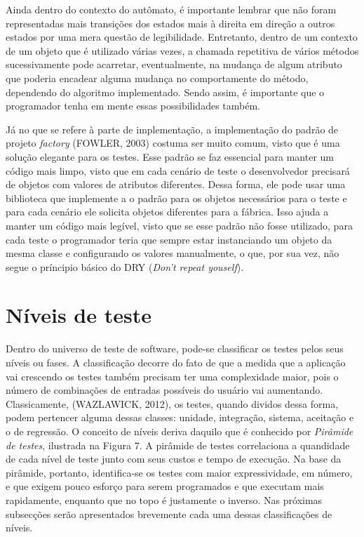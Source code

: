 \documentclass[
    12pt,       %
    openright,      %
    twoside,      %
    a4paper,      %
    english,      %
    french,       %
    spanish,      %
    brazil,       %
    ]{abntex2}
\begin{document}
          Ainda dentro do contexto do autômato, é importante lembrar que não foram representadas
          mais transições dos estados mais à direita em direção a outros estados por uma mera
          questão de legibilidade. Entretanto, dentro de um contexto de um objeto que é utilizado
          várias vezes, a chamada repetitiva de vários métodos sucessivamente pode acarretar,
          eventualmente, na mudança de algum atributo que poderia encadear alguma mudança no
          comportamente do método, dependendo do algoritmo implementado. Sendo assim, é importante
          que o programador tenha em mente essas possibilidades também.

          Já no que se refere à parte de implementação, a implementação do padrão de projeto
          \textit{factory} (FOWLER, 2003) costuma ser muito comum, visto que é uma solução elegante
          para os testes. Esse padrão se faz essencial para manter um código mais limpo,
          visto que em cada cenário de teste o desenvolvedor precisará de objetos com valores de
          atributos diferentes. Dessa forma, ele pode usar uma biblioteca que implemente a
          o padrão para os objetos necessários para o teste e para cada cenário ele solicita
          objetos diferentes para a fábrica. Isso ajuda a manter um código mais legível, visto
          que se esse padrão não fosse utilizado, para cada teste o programador teria que sempre
          estar instanciando um objeto da mesma classe e configurando os valores manualmente,
          o que, por sua vez, não segue o príncipio básico do DRY (\textit{Don't repeat youself}).

      \section{Níveis de teste}
          Dentro do universo de teste de software, pode-se classificar os testes pelos seus
          níveis ou fases. A classificação decorre do fato de que a medida que a aplicação
          vai crescendo os testes também precisam ter uma complexidade maior, pois o número
          de combinações de entradas possíveis do usuário vai aumentando. Classicamente,
          (WAZLAWICK, 2012), os testes, quando dividos dessa forma, podem pertencer alguma
          dessas classes: unidade, integração, sistema, aceitação e o de regressão. O
          conceito de níveis deriva daquilo que é conhecido por \textit{Pirâmide de testes},
          ilustrada na Figura 7. A pirâmide de testes correlaciona a quandidade de cada nível
          de teste junto com seus custos e tempo de execução. Na base da pirâmide, portanto,
          identifica-se os testes com maior expressividade, em número, e que exigem pouco
          esforço para serem programados e que executam mais rapidamente, enquanto que no topo
          é justamente o inverso. Nas próximas subsecções serão apresentados brevemente cada
          uma dessas classificações de níveis.
\end{document}
